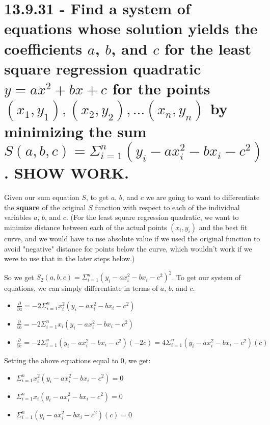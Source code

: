 \documentclass{article}
\begin{document}
\section{13.9.31 - Find a system of equations whose solution yields the coefficients $a$, $b$, and $c$ for the least square regression quadratic $y = ax^{2} + bx + c$ for the points $(x_{1}, y_{1}), (x_{2}, y_{2}), ... (x_{n}, y_{n})$ by minimizing the sum \\$S(a, b, c) = \Sigma_{i = 1}^{n}(y_{i} - ax_{i}^{2} - bx_{i} - c^{2})$.  SHOW WORK.}

\par\noindent\large Given our sum equation $S$, to get $a$, $b$, and $c$ we are going to want to differentiate the \textbf{square} of the original $S$ function with respect to each of the individual variables $a$, $b$, and $c$.  (For the least square regression quadratic, we want to minimize distance between each of the actual points $(x_{i}, y_{i})$ and the best fit curve, and we would have to use absolute value if we used the original function to avoid "negative" distance for points below the curve, which wouldn't work if we were to use that in the later steps below.)\vspace{0.25cm}
\par\noindent So we get $S_{2}(a, b, c) = \Sigma_{i = 1}^{n}(y_{i} - ax_{i}^{2} - bx_{i} - c^{2})^{2}$.  To get our system of equations, we can simply differentiate in terms of $a$, $b$, and $c$.

\begin{itemize}
    \Large
  \item\Large $\frac{\partial}{\partial a} = -2\Sigma_{i = 1}^{n} x_{i}^{2}(y_{i} - ax_{i}^{2} - bx_{i} - c^{2})$
  \item\Large $\frac{\partial}{\partial b} = -2\Sigma_{i = 1}^{n} x_{i}(y_{i} - ax_{i}^{2} - bx_{i} - c^{2})$
  \item $\frac{\partial}{\partial c} = -2\Sigma_{i = 1}^{n} (y_{i} - ax_{i}^{2} - bx_{i} - c^{2})(-2c) = 4\Sigma_{i = 1}^{n} (y_{i} - ax_{i}^{2} - bx_{i} - c^{2})(c)$
\end{itemize}

\par\noindent\large Setting the above equations equal to 0, we get:
\begin{itemize}
    \Large
  \item\Large $\Sigma_{i = 1}^{n} x_{i}^{2}(y_{i} - ax_{i}^{2} - bx_{i} - c^{2}) = 0$
  \item\Large $\Sigma_{i = 1}^{n} x_{i}(y_{i} - ax_{i}^{2} - bx_{i} - c^{2}) = 0$
  \item $\Sigma_{i = 1}^{n} (y_{i} - ax_{i}^{2} - bx_{i} - c^{2})(c) = 0$
\end{itemize}
\end{document}
